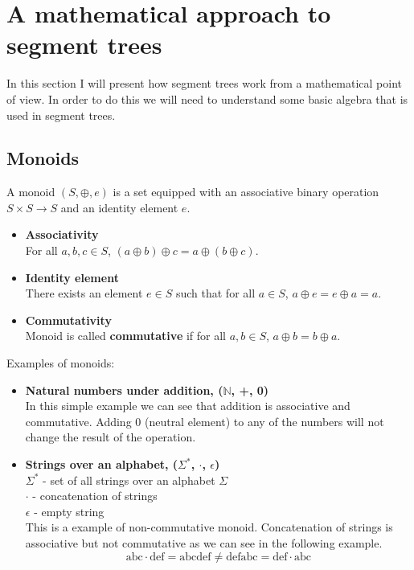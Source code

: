 \documentclass[11pt]{article}
\begin{document}
\vspace{1em}


\section{A mathematical approach to segment trees}
In this section I will present how segment trees work from a mathematical point of view.
In order to do this we will need to understand some basic algebra that is used in segment trees.


\subsection{Monoids}
A monoid \( (S, \oplus, e) \) is a set equipped with an associative binary operation \( S \times S \to S \) and
an identity element \(e\). 
\begin{itemize}
    \item \textbf{Associativity} \\
    For all \( a, b, c \in S \), \( (a \oplus b) \oplus c = a \oplus (b \oplus c) \).
    \item \textbf{Identity element} \\
    There exists an element \( e \in S \) such that for all \( a \in S \), \( a \oplus e = e \oplus a = a \).
    \item \textbf{Commutativity} \\
    Monoid is called \textbf{commutative} if for all \( a, b \in S \), \( a \oplus b = b \oplus a \).
\end{itemize}
Examples of monoids:
\begin{itemize}
    \item \textbf{Natural numbers under addition, (\(\mathbb{N}\), +, 0) } \\
    In this simple example we can see that addition is associative and commutative. 
    Adding 0 (neutral element) to any of the numbers will not change the result of the operation.
    \item \textbf{Strings over an alphabet, (\(\Sigma^*\), \(\cdot\), \(\epsilon\))} \\
    \(\Sigma^*\) - set of all strings over an alphabet \(\Sigma\) \\
    \(\cdot\) - concatenation of strings \\
    \(\epsilon\) - empty string \\
    This is a example of non-commutative monoid. Concatenation of strings is associative but not commutative as we can see in the following example.
    \begin{equation}
        \text{abc} \cdot \text{def} = \text{abcdef} \neq \text{defabc} = \text{def} \cdot \text{abc}
    \end{equation}
\end{itemize}
\end{document}
